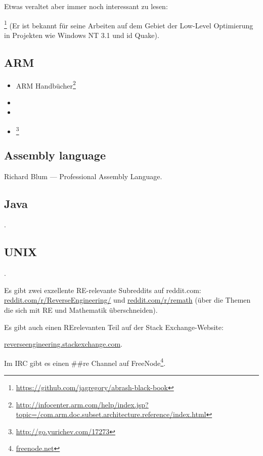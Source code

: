 Etwas veraltet aber immer noch interessant zu lesen:

\MAbrash\footnote{\AlsoAvailableAs \url{https://github.com/jagregory/abrash-black-book}}
(Er ist bekannt für seine Arbeiten auf dem Gebiet der Low-Level Optimierung in Projekten wie Windows NT 3.1 und id Quake).

\subsection{ARM}

\begin{itemize}
\item ARM Handbücher\footnote{\AlsoAvailableAs \url{http://infocenter.arm.com/help/index.jsp?topic=/com.arm.doc.subset.architecture.reference/index.html}}

\item \ARMSevenRef

\item \ARMSixFourRefURL

\item \ARMCookBook\footnote{\AlsoAvailableAs \url{http://go.yurichev.com/17273}}
\end{itemize}

\subsection{Assembly language}

Richard Blum --- Professional Assembly Language.

\subsection{Java}

\JavaBook.

\subsection{UNIX}

\TAOUP




\HenryWarren.

Es gibt zwei exzellente \ac{RE}-relevante Subreddits auf reddit.com:
\href{http://go.yurichev.com/17027}{reddit.com/r/ReverseEngineering/} und
\href{http://go.yurichev.com/17028}{reddit.com/r/remath}
(über die Themen die sich mit \ac{RE} und Mathematik überschneiden).

Es gibt auch einen \ac{RE}relevanten Teil auf der Stack Exchange-Website:

\par \href{http://go.yurichev.com/17029}{reverseengineering.stackexchange.com}.

Im IRC gibt es einen \#\#re Channel auf
FreeNode\footnote{\href{http://go.yurichev.com/17030}{freenode.net}}.

